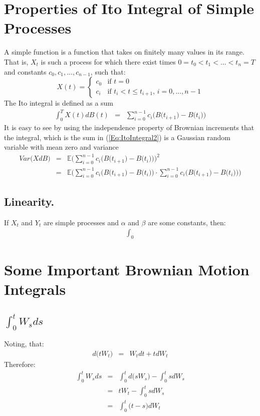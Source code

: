 \section{Properties of Ito Integral of Simple Processes}
A simple function is a function that takes on finitely many values in its range.\\
That is, $X_{t}$ is such a process for which there exist times $0 = t_{0} < t_{1} < ... < t_{n} = T$ and constants $c_{0}, c_{1}, ..., c_{n - 1}$, such that:
\begin{equation}
	X(t) = \begin{cases}
	c_{0} & \text{if $t = 0$}\\
	c_{i} & \text{if $t_{i} < t \leq t_{i + 1}$, $i = 0, ..., n - 1$}
	\end{cases}
\end{equation}
The Ito integral is defined as a sum
\begin{eqnarray}
	\label{Eq:ItoIntegral2}
	\int_{0}^{T}X(t)dB(t) &=& \sum_{i = 0}^{n - 1}c_{i}\Big(B\big(t_{i + 1}\big) - B\big(t_{i}\big)\Big)
\end{eqnarray}
It is easy to see by using the independence property of Brownian increments that the integral, which is the sum in (\ref{Eq:ItoIntegral2}) is a Gaussian random variable with mean zero and variance
\begin{eqnarray}
	Var\Bigg(XdB\Bigg) &=& \mathbb{E}\Bigg(\sum_{i = 0}^{n - 1}c_{i}\bigg(B\Big(t_{i + 1}\Big) - B\Big(t_{i}\Big)\bigg)\Bigg)^{2}\\
	\nonumber
	&=& \mathbb{E}\Bigg(\sum_{i = 0}^{n - 1}c_{i}\bigg(B\Big(t_{i + 1}\Big) - B\Big(t_{i}\Big)\bigg) \cdot \sum_{i = 0}^{n - 1}c_{i}\bigg(B\Big(t_{i + 1}\Big) - B\Big(t_{i}\Big)\bigg)\Bigg)
\end{eqnarray} 


\subsection{Linearity.}If $X_{t}$ and $Y_{t}$ are simple processes and $\alpha$ and $\beta$ are some constants, then:
\begin{eqnarray}
	\int_{0}
\end{eqnarray}


\section{Some Important Brownian Motion Integrals}

\subsection{$\int_{0}^{t}W_{s}ds$}
Noting, that:
\begin{eqnarray}
	d\Big(tW_{t}\Big) &=& W_{t}dt + tdW_{t}
\end{eqnarray}
Therefore:
\begin{eqnarray}
	\int_{0}^{t}W_{s}ds &=& \int_{0}^{t}d\Big(sW_{s}\Big) - \int_{0}^{t}sdW_{s}\\
	&=& tW_{t} - \int_{0}^{t}sdW_{s}\\
	&=& \int_{0}^{t}\Big(t - s\Big)dW_{t}
\end{eqnarray}


